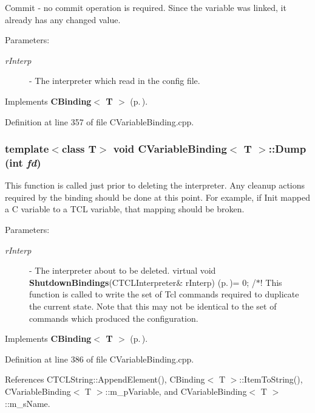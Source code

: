 Commit - no commit operation is required. Since the variable was linked, it already has any changed value.\begin{Desc}
\item[Parameters: ]\par
\begin{description}
\item[{\em 
r\-Interp}]- The interpreter which read in the config file. \end{description}
\end{Desc}


Implements {\bf CBinding$<$ T $>$} {\rm (p.\,\pageref{classCBinding_a1})}.

Definition at line 357 of file CVariable\-Binding.cpp.
\subsubsection{\setlength{\rightskip}{0pt plus 5cm}template$<$class T$>$ void CVariable\-Binding$<$ T $>$::Dump (int {\em fd})\hspace{0.3cm}{\tt  [virtual]}}\label{classCVariableBinding_a16}


This function is called just prior to deleting the interpreter. Any cleanup actions required by the binding should be done at this point. For example, if Init mapped a C variable to a TCL variable, that mapping should be broken. \begin{Desc}
\item[Parameters: ]\par
\begin{description}
\item[{\em 
r\-Interp}]- The interpreter about to be deleted. virtual void {\bf Shutdown\-Bindings}(CTCLInterpreter\& r\-Interp) {\rm (p.\,\pageref{classCVariableBinding_a15})}= 0; /$\ast$! This function is called to write the set of Tcl commands required to duplicate the current state. Note that this may not be identical to the set of commands which produced the configuration. \end{description}
\end{Desc}


Implements {\bf CBinding$<$ T $>$} {\rm (p.\,\pageref{classCBinding_a2})}.

Definition at line 386 of file CVariable\-Binding.cpp.

References CTCLString::Append\-Element(), CBinding$<$ T $>$::Item\-To\-String(), CVariable\-Binding$<$ T $>$::m\_\-p\-Variable, and CVariable\-Binding$<$ T $>$::m\_\-s\-Name.
